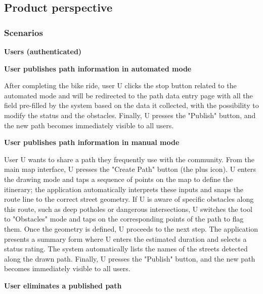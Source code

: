 \subsection{Product perspective}

\subsubsection{Scenarios}

    \textbf{Users (authenticated)} 
    \vspace{2mm}
    \noindent


    \noindent
    \textbf{User publishes path information in automated mode} 
    \vspace{1mm}
    
    \noindent
    After completing the bike ride,  user U clicks the stop button related to the automated mode and will be redirected to the path data entry page with all the field 
    pre-filled by the system based on the data it collected, with the possibility to modify the status and the obstacles. Finally, U presses the "Publish" button, and the new path becomes immediately visible to all users.

    \vspace{3mm}
    \noindent
    \textbf{User publishes path information in manual mode} 
    \vspace{1mm}
    
    \noindent
    User U wants to share a path they frequently use with the community. From the main map interface, U presses the "Create Path" button (the plus icon). U enters the drawing mode and taps a sequence of points on the map to define the itinerary; the application automatically interprets these inputs and snaps the route line to the correct street geometry. If U is aware of specific obstacles along this route, such as deep potholes or dangerous intersections, U switches the tool to "Obstacles" mode and taps on the corresponding points of the path to flag them. Once the geometry is defined, U proceeds to the next step. The application presents a summary form where U enters the estimated duration and selects a status rating. The system automatically lists the names of the streets detected along the drawn path. Finally, U presses the "Publish" button, and the new path becomes immediately visible to all users.

    \vspace{3mm}
    \noindent
    \textbf{User eliminates a published path} 
    \vspace{1mm}
    
